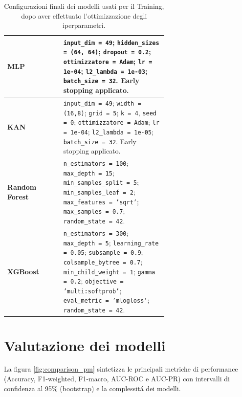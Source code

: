 \documentclass[a4paper,12pt]{report}
\begin{document}
	\begin{table}[H]
		\centering
		\caption{Configurazioni finali dei modelli usati per il Training, dopo aver effettuato l'ottimizzazione degli iperparametri.}
		\label{tab:model-config-pm}
		\begin{tabular}{l p{0.65\linewidth}}
			\toprule
			\textbf{MLP} & \texttt{input\_dim = 49}; \texttt{hidden\_sizes = (64, 64)}; \texttt{dropout = 0.2}; \texttt{ottimizzatore = Adam}; \texttt{lr = 1e-04}; \texttt{l2\_lambda = 1e-03}; \texttt{batch\_size = 32}. Early stopping applicato. \\
			\midrule
			\textbf{KAN} & \texttt{input\_dim = 49}; \texttt{width = (16,8)}; \texttt{grid = 5}; \texttt{k = 4}, \texttt{seed = 0}; \texttt{ottimizzatore = Adam}; \texttt{lr = 1e-04}; \texttt{l2\_lambda = 1e-05}; \texttt{batch\_size = 32}. Early stopping applicato. \\
			\midrule
			\textbf{Random Forest} & \texttt{n\_estimators = 100}; \texttt{max\_depth = 15}; \texttt{min\_samples\_split = 5}; \texttt{min\_samples\_leaf = 2}; \texttt{max\_features = 'sqrt'}; \texttt{max\_samples = 0.7}; \texttt{random\_state = 42}. \\
			\midrule
			\textbf{XGBoost} & \texttt{n\_estimators = 300}; \texttt{max\_depth = 5}; \texttt{learning\_rate = 0.05}; \texttt{subsample = 0.9}; \texttt{colsample\_bytree = 0.7}; \texttt{min\_child\_weight = 1}; \texttt{gamma = 0.2}; \texttt{objective = 'multi:softprob'}; \texttt{eval\_metric = 'mlogloss'}; \texttt{random\_state = 42}. \\
			\bottomrule
		\end{tabular}
	\end{table}
	
	\section{Valutazione dei modelli}
	
	La figura \ref{fig:comparison_pm} sintetizza le principali metriche di performance (Accuracy, F1-weighted, F1-macro, AUC-ROC e AUC-PR) con intervalli di confidenza al 95\% (bootstrap) e la complessitá dei modelli.
	
\end{document}
